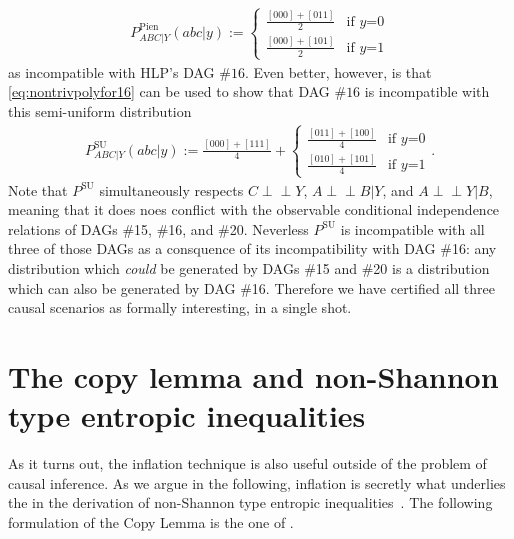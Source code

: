 \documentclass[aps,english,superscriptaddress,onecolumn,twoside,longbibliography,pra,floatfix,fleqn,nofootinbib]{revtex4-1}%
\newcommand*{\tblue}[1]{{\color{MidnightBlue}{\textbf{#1}}}}
\theoremstyle{definition}
\newcommand{\p}[2][]{{P_{#1}}\parenths{#2}}
\newcommand{\indep}{\cramp{\perp\!\!\!\!\perp}} %
\newcommand{\cramp}[1]{\ensuremath{\mathord{#1}}}
\newcommand{\eql}{\cramp{=}}
\DeclarePairedDelimiter{\parenths}{\lparen}{\rparen}
\begin{document}
{\begin{align}
  P^{\text{Pien}}_{A B C|Y}(a b c| y):=\begin{cases}\frac{[000]+[011]}{2}&\text{if }  y\eql 0 \\ \frac{[000]+[101]}{2}&\text{if }  y\eql 1\end{cases}
\end{align}
as incompatible with HLP's DAG $\#16$. Even better, however, is that \cref{eq:nontrivpolyfor16} can be used to show that DAG $\#16$ is incompatible with this semi-uniform distribution
\begin{align}\label{eq:allcirespectingdistro}
  P^{\text{SU}}_{A B C|Y}(a b c| y):=\frac{[000]+[111]}{4}+\begin{cases}\frac{[011]+[100]}{4}&\text{if }  y\eql 0 \\ \frac{[010]+[101]}{4}&\text{if }  y\eql 1\end{cases}.
\end{align}
Note that $P^{\text{SU}}$ simultaneously respects  $C\indep Y$, $A\indep B|Y$, and $A\indep Y|B$, meaning that it does noes conflict with the observable conditional independence relations of DAGs \#15, \#16, and \#20. Neverless $P^{\text{SU}}$ is incompatible with all three of those DAGs as a consquence of its incompatibility with DAG \#16: any distribution which \emph{could} be generated by DAGs \#15 and \#20 is a distribution which can also be generated by DAG \#16. Therefore we have certified all three causal scenarios as formally interesting, in a single shot.
}













\section{The copy lemma and non-Shannon type entropic inequalities}\label{sec:NonShannon}

As it turns out, the inflation technique is also useful outside of the problem of causal inference. As we argue in the following, inflation is secretly what underlies the \tblue{Copy Lemma} in the derivation of non-Shannon type entropic inequalities~\cite[Chapter~15]{yeung_network_2008}. The following formulation of the Copy Lemma is the one of \citet{kaced_equivalence_2013}.
\end{document}
